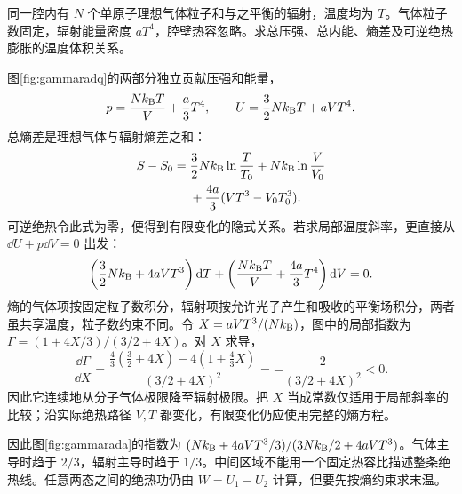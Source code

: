 \begin{example}[分子气体与辐射共同膨胀]
同一腔内有 $N$ 个单原子理想气体粒子和与之平衡的辐射，温度均为 $T$。气体粒子数固定，辐射能量密度 $aT^4$，腔壁热容忽略。求总压强、总内能、熵差及可逆绝热膨胀的温度体积关系。
\end{example}
\begin{solution}
图\ref{fig:gammaradq}的两部分独立贡献压强和能量，
\[
 p=\frac{Nk_{\mathrm B} T}V+\frac a3T^4,\qquad
 U=\frac32Nk_{\mathrm B} T+aVT^4.
\]
总熵差是理想气体与辐射熵差之和：
\begin{align*}
 S-S_0={}&\frac32Nk_{\mathrm B}\ln\frac T{T_0}+Nk_{\mathrm B}\ln\frac V{V_0}\\
 &+\frac{4a}3(VT^3-V_0T_0^3).
\end{align*}
可逆绝热令此式为零，便得到有限变化的隐式关系。若求局部温度斜率，更直接从 $\dd U+p\dd V=0$ 出发：
\[
 \left(\frac32Nk_{\mathrm B}+4aVT^3\right)\mathop{}\!\mathrm d T
 +\left(\frac{Nk_{\mathrm B} T}V+\frac{4a}3T^4\right)\mathop{}\!\mathrm d V=0.
\]
熵的气体项按固定粒子数积分，辐射项按允许光子产生和吸收的平衡场积分，两者虽共享温度，粒子数约束不同。令 $X=aVT^3/(Nk_{\mathrm B})$，图中的局部指数为 $\Gamma=(1+4X/3)/(3/2+4X)$。对 $X$ 求导，
\[
 \frac{\dd\Gamma}{\dd X}
 =\frac{\tfrac43(\tfrac32+4X)-4(1+\tfrac43X)}{(3/2+4X)^2}
 =-\frac{2}{(3/2+4X)^2}<0.
\]
因此它连续地从分子气体极限降至辐射极限。把 $X$ 当成常数仅适用于局部斜率的比较；沿实际绝热路径 $V,T$ 都变化，有限变化仍应使用完整的熵方程。

因此图\ref{fig:gammarada}的指数为 $(Nk_{\mathrm B}+4aVT^3/3)/(3Nk_{\mathrm B}/2+4aVT^3)$。气体主导时趋于 $2/3$，辐射主导时趋于 $1/3$。中间区域不能用一个固定热容比描述整条绝热线。任意两态之间的绝热功仍由 $W=U_1-U_2$ 计算，但要先按熵约束求末温。
\end{solution}

